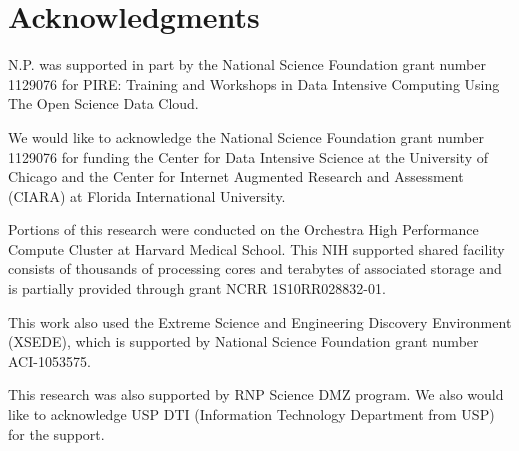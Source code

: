 \documentclass{sig-alternate-05-2015}
\begin{document}
\section{Acknowledgments}
N.P. was supported in part by the National Science Foundation grant number 1129076 for PIRE: Training and Workshops in Data Intensive Computing Using The Open Science Data Cloud.

We would like to acknowledge the National Science Foundation grant number 1129076 for funding the Center for Data Intensive Science at the University of Chicago and the Center for Internet Augmented Research and Assessment (CIARA) at Florida International University.

Portions of this research were conducted on the Orchestra High Performance Compute Cluster at Harvard Medical School. This NIH supported shared facility consists of thousands of processing cores and terabytes of associated storage and is partially provided through grant NCRR 1S10RR028832-01.

This work also used the Extreme Science and Engineering Discovery Environment (XSEDE), which is supported by National Science Foundation grant number ACI-1053575.

This research was also supported by RNP Science DMZ program. We also would like to acknowledge USP DTI (Information Technology Department from USP) for the support. 



\end{document}
